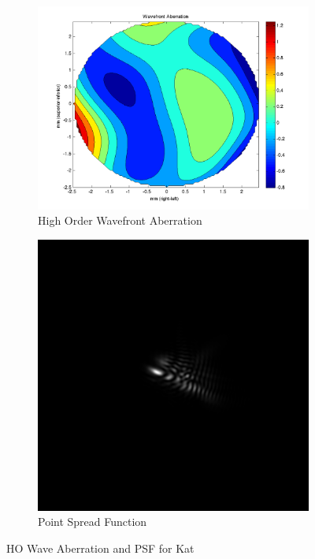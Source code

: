 \documentclass{article}
\begin{document}
\clearpage

\begin{figure}[H]
\begin{subfigure}{.5\textwidth}
  \centering
  \includegraphics[width=1\linewidth]{Kat_WFA.png}
  \caption{High Order Wavefront Aberration}
  \label{fig:kathowa}
\end{subfigure}%
\begin{subfigure}{.5\textwidth}
  \centering
  \includegraphics[width=0.8\linewidth]{Kat_PSF.png}
  \caption{Point Spread Function}
  \label{fig:katpsf}
\end{subfigure}
\caption{HO Wave Aberration and PSF for Kat}
\label{fig:kat}
\end{figure}
\end{document}
